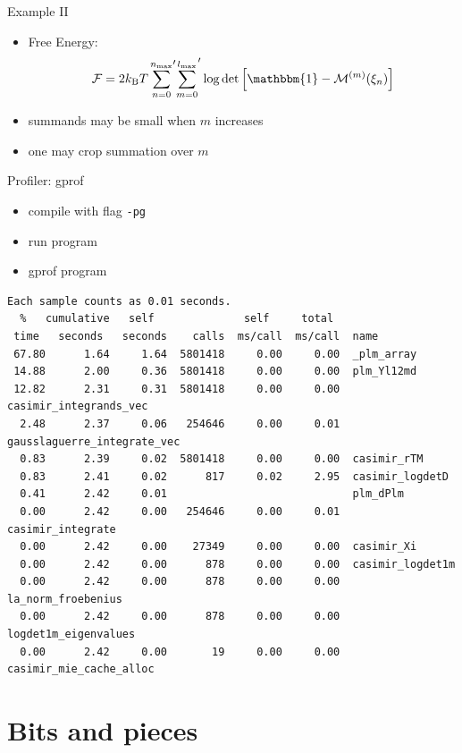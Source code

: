\documentclass[12pt,compress,mathserif]{beamer}
\newcommand{\kb}{k_\text{B}}
\begin{document}
\begin{frame}{Example II}
    \begin{itemize}
    \item Free Energy:
    \begin{equation}
    \nonumber
    \mathcal{F} = 2\kb T \, {\sum_{n=0}^{n_\text{max}}}^\prime {\sum_{m=0}^{l_\text{max}}}^\prime \log\det \left[ \mathbbm{1} - \mathcal{M}^{(m)}(\xi_n)\right]
    \end{equation}
    \item summands may be small when $m$ increases
    \item one may crop summation over $m$
    \end{itemize}
\end{frame}

\begin{frame}[fragile]{Profiler: gprof}
\begin{itemize}
    \item compile with flag \texttt{-pg}
    \item run program
    \item gprof program
\end{itemize}
\tiny
\begin{verbatim}
Each sample counts as 0.01 seconds.
  %   cumulative   self              self     total
 time   seconds   seconds    calls  ms/call  ms/call  name
 67.80      1.64     1.64  5801418     0.00     0.00  _plm_array
 14.88      2.00     0.36  5801418     0.00     0.00  plm_Yl12md
 12.82      2.31     0.31  5801418     0.00     0.00  casimir_integrands_vec
  2.48      2.37     0.06   254646     0.00     0.01  gausslaguerre_integrate_vec
  0.83      2.39     0.02  5801418     0.00     0.00  casimir_rTM
  0.83      2.41     0.02      817     0.02     2.95  casimir_logdetD
  0.41      2.42     0.01                             plm_dPlm
  0.00      2.42     0.00   254646     0.00     0.01  casimir_integrate
  0.00      2.42     0.00    27349     0.00     0.00  casimir_Xi
  0.00      2.42     0.00      878     0.00     0.00  casimir_logdet1m
  0.00      2.42     0.00      878     0.00     0.00  la_norm_froebenius
  0.00      2.42     0.00      878     0.00     0.00  logdet1m_eigenvalues
  0.00      2.42     0.00       19     0.00     0.00  casimir_mie_cache_alloc
\end{verbatim}
\end{frame}

\section{Bits and pieces}
\end{document}
